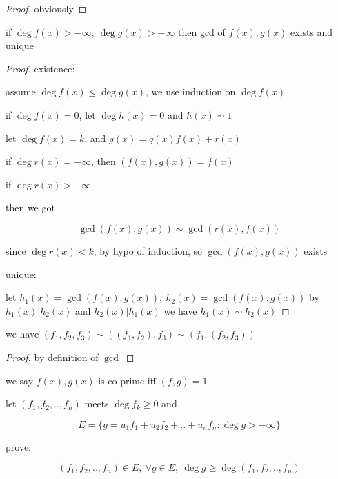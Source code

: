 \begin{proof}
    obviously
\end{proof}



\begin{exercise}
    if $\deg f(x) > -\infty,\: \deg g(x) > -\infty$ then gcd of $f(x), g(x)$ exists and unique
\end{exercise}

\begin{proof}
existence:
  
   assume $\deg f(x) \le \deg g(x)$, we use induction on $\deg f(x)$

   if $\deg f(x) = 0$, let $\deg h(x) = 0$ and $h(x) \sim 1$

   let $\deg f(x) = k$, and $g(x) = q(x)f(x) + r(x)$

   if $\deg r(x) = -\infty$, then $(f(x),g(x)) = f(x)$

   if $\deg r(x) > -\infty$
   
   then we got

   \[
        \gcd(f(x), g(x)) \sim \gcd(r(x), f(x))
   \]


   since $\deg r(x) < k$, by hypo of induction, so $\gcd(f(x), g(x))$ exists

unique:

    let $h_1(x) = \gcd(f(x), g(x)),\: h_2(x) = \gcd(f(x), g(x))$ by $h_1(x) | h_2(x)$ and $h_2(x) | h_1(x)$
    we have $h_1(x) \sim h_2(x)$
   
\end{proof}

\begin{exercise}
    we have $(f_1, f_2, f_3) \sim ((f_1,f_2),f_3) \sim (f_1, (f_2,f_3))$
\end{exercise}

\begin{proof}
    by definition of $\gcd$
\end{proof}

\begin{definition}
    we say $f(x), g(x)$ is co-prime iff $(f,g) = 1$
\end{definition}

\begin{exercise}
    
    let $(f_1,f_2,..,f_n)$ meets $\deg f_k \ge 0$ and

    \[
        E = \{ g = u_1f_1 + u_2f_2 + .. + u_nf_n: \deg g > -\infty \}
    \]

    prove:

    \[
        (f_1,f_2,..,f_n) \in E,\: \forall g \in E,\: \deg g \ge \deg (f_1,f_2,..,f_n)
    \]
\end{exercise}


